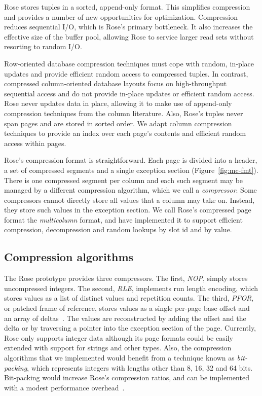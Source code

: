 \documentclass{vldb}
\newcommand{\rows}{Rose\xspace}
\newcommand{\rowss}{Rose's\xspace}
\begin{document}
\rows stores tuples in a sorted, append-only format.  This 
simplifies compression and provides a number of new opportunities for
optimization.  Compression reduces sequential I/O, which is \rowss primary bottleneck.
It also
increases the effective size of the buffer pool, allowing \rows to
service larger read sets without resorting to random I/O.

Row-oriented database compression techniques must cope with random,
in-place updates and provide efficient random access to compressed
tuples.  In contrast, compressed column-oriented database layouts
focus on high-throughput sequential access and do not provide in-place
updates or efficient random access.  \rows never updates data in
place, allowing it to make use of append-only compression techniques
from the column literature.  Also, \rowss tuples never span pages and
are stored in sorted order.  We adapt column compression techniques to provide an
index over each page's contents and efficient random access within
pages.

\rowss compression format is straightforward.  Each page is divided into
a header, a set of compressed segments and a single exception section
(Figure~\ref{fig:mc-fmt}).  There is one compressed segment per column
and each such segment may be managed by a different compression
algorithm, which we call a {\em compressor}.  Some compressors cannot
directly store all values that a column may take on.  Instead, they
store such values in the exception section.  We call
\rowss compressed page format the {\em multicolumn} format, and have
implemented it to support efficient compression,
decompression and random lookups by slot id and by value.

\subsection{Compression algorithms}
The \rows prototype provides three compressors.  The first, {\em NOP},
simply stores uncompressed integers.  The second, {\em RLE},
implements run length encoding, which stores values as a list of
distinct values and repetition counts.  The third, {\em PFOR}, or
patched frame of reference, stores values as a single per-page
base offset and an array of deltas~\cite{pfor}.  The values are reconstructed by
adding the offset and the delta or by traversing a pointer into the
exception section of the page.  Currently, \rows only supports integer
data although its page formats could be easily extended with support for strings and
other types.  Also, the compression algorithms that we
implemented would benefit from a technique known as {\em bit-packing},
which represents integers with lengths other than 8, 16, 32 and 64
bits.  Bit-packing would increase \rowss compression ratios,
and can be implemented with a modest performance overhead~\cite{pfor}.
\end{document}
